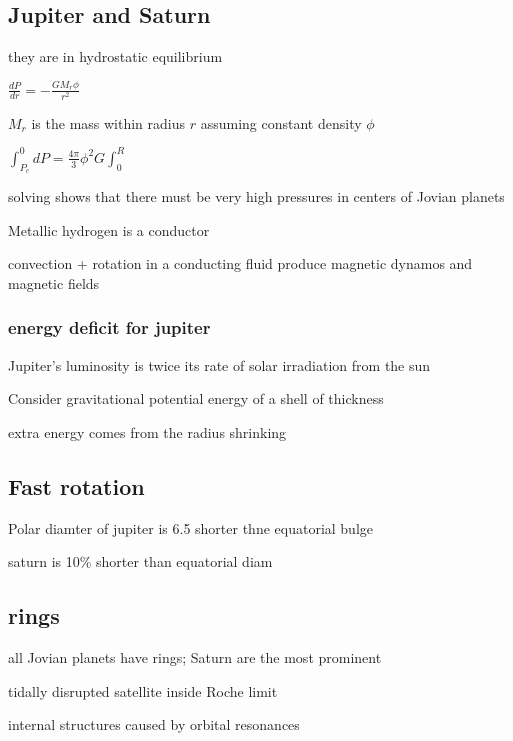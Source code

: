 \documentclass{article}
\begin{document}
\subsection{Jupiter and Saturn} 
\begin{list}{-}{}
\item they are in hydrostatic equilibrium
\item \(\frac{dP}{dr} = -\frac{GM_r \phi}{r^2}\)
\item \(M_r\) is the mass within radius \(r\) assuming constant density \(\phi\)
\item \(\int_{P_c}^{0} dP = \frac{4\pi}{3} \phi^2 G \int_{0}^{R}\)
\item solving shows that there must be very high pressures in centers of Jovian planets
\item Metallic hydrogen is a conductor 
\item convection + rotation in a conducting fluid produce magnetic dynamos and magnetic fields
\end{list}

\subsubsection{energy deficit for jupiter}
\begin{list}{-}{}
\item Jupiter's luminosity is twice its rate of solar irradiation from the sun
\item Consider gravitational potential energy of a shell of thickness
\item extra energy comes from the radius shrinking  
\end{list}

\subsection{Fast rotation}
\begin{list}{-}{}
\item Polar diamter of jupiter is 6.5 shorter thne equatorial bulge 
\item saturn is 10\% shorter than equatorial diam
\end{list}

\subsection{rings}
\begin{list}{-}{}
\item all Jovian planets have rings; Saturn are the most prominent
\item tidally disrupted satellite inside Roche limit
\item internal structures caused by orbital resonances
\end{list}
\end{document}
